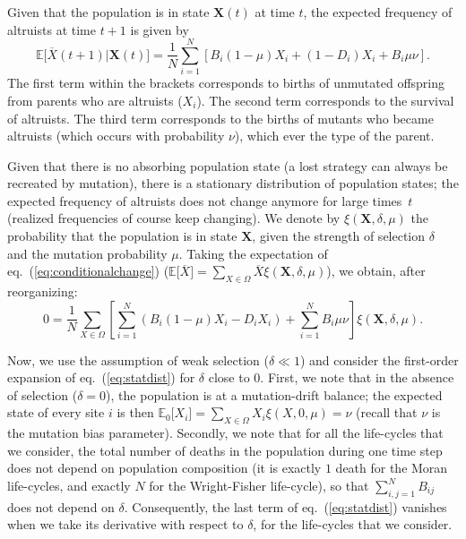 \documentclass[11pt, letterpaper]{article}
\renewcommand{\eqref}[1]{\textup{{\normalfont eq.~(\ref{#1}}\normalfont)}}
\newcommand{\Esp}[1]{\mathbb{E}\big[ #1\big]}%
\newcommand{\Espzero}[1]{\mathbb{E}_0\big[ #1\big]}%
\newcommand{\mutbias}{\nu}
\newcommand{\selstr}{\delta}
\begin{document}
Given that the population is in state $\mathbf{X}(t)$ at time $t$, the expected frequency of altruists at time $t+1$ is given by
\begin{subequations}
\begin{equation}\label{eq:conditionalchange}
\Esp{\overline{X}(t+1) | \mathbf{X}(t)} = %
\frac{1}{N} \sum_{i=1}^N \left[ B_i (1-\mu) X_i + (1-D_i) X_i + B_i \mu \mutbias  \right]. 
\end{equation}
\end{subequations}
The first term within the brackets corresponds to births of unmutated offspring from parents who are altruists ($X_i$). The second term corresponds to the survival of altruists. The third term corresponds to the births of mutants who became altruists (which occurs with probability $\nu$), which ever the type of the parent. 

Given that there is no absorbing population state (a lost strategy can always be recreated by mutation), there is a stationary distribution of population states; the expected frequency of altruists does not change anymore for large times~$t$ (realized frequencies of course keep changing). We denote by $\xi(\mathbf{X}, \selstr, \mu)$ the probability that the population is in state $\mathbf{X}$, given the strength of selection $\selstr$ and the mutation probability $\mu$. Taking the expectation of \eqref{eq:conditionalchange} ($\Esp{\overline{X}} = \sum_{X \in \Omega} \overline{X}\xi(\mathbf{X}, \selstr, \mu)$), we obtain, after reorganizing:
\begin{equation}\label{eq:statdist}
0 = \frac{1}{N} \sum_{X\in \Omega} \left[ \sum_{i=1}^N \left( B_i (1-\mu) X_i - D_i X_i \right) + \sum_{i=1}^N B_i \mu \mutbias \right] \xi(\mathbf{X}, \selstr, \mu). 
\end{equation}

Now, we use the assumption of weak selection ($\selstr \ll 1$) and consider the first-order expansion of \eqref{eq:statdist} for $\selstr$ close to $0$. First, we note that in the absence of selection ($\selstr = 0$), the population is at a mutation-drift balance; the expected state of every site $i$ is then $\Espzero{X_i} = \sum_{X\in \Omega} X_i \xi(X, 0, \mu)= \mutbias$ (recall that $\mutbias$ is the mutation bias parameter). Secondly, we note that for all the life-cycles that we consider, the total number of deaths in the population during one time step does not depend on population composition (it is exactly $1$ death for the Moran life-cycles, and exactly $N$ for the Wright-Fisher life-cycle), so that $\sum_{i,j=1}^N B_{ij}$ does not depend on $\selstr$. Consequently, the last term of \eqref{eq:statdist} vanishes when we take its derivative with respect to $\selstr$, for the life-cycles that we consider.  
\end{document}
